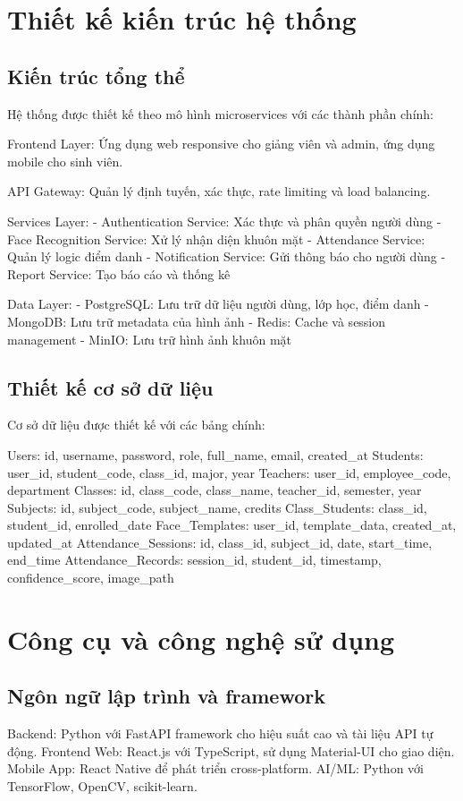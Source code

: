 \documentclass[12pt,a4paper]{report}
\begin{document}
\section{Thiết kế kiến trúc hệ thống}
\subsection{Kiến trúc tổng thể}
Hệ thống được thiết kế theo mô hình microservices với các thành phần chính:

Frontend Layer: Ứng dụng web responsive cho giảng viên và admin, ứng dụng mobile cho sinh viên.

API Gateway: Quản lý định tuyến, xác thực, rate limiting và load balancing.

Services Layer: 
- Authentication Service: Xác thực và phân quyền người dùng
- Face Recognition Service: Xử lý nhận diện khuôn mặt
- Attendance Service: Quản lý logic điểm danh
- Notification Service: Gửi thông báo cho người dùng
- Report Service: Tạo báo cáo và thống kê

Data Layer: 
- PostgreSQL: Lưu trữ dữ liệu người dùng, lớp học, điểm danh
- MongoDB: Lưu trữ metadata của hình ảnh
- Redis: Cache và session management
- MinIO: Lưu trữ hình ảnh khuôn mặt

\subsection{Thiết kế cơ sở dữ liệu}
Cơ sở dữ liệu được thiết kế với các bảng chính:

Users: id, username, password, role, full_name, email, created_at
Students: user_id, student_code, class_id, major, year
Teachers: user_id, employee_code, department
Classes: id, class_code, class_name, teacher_id, semester, year
Subjects: id, subject_code, subject_name, credits
Class_Students: class_id, student_id, enrolled_date
Face_Templates: user_id, template_data, created_at, updated_at
Attendance_Sessions: id, class_id, subject_id, date, start_time, end_time
Attendance_Records: session_id, student_id, timestamp, confidence_score, image_path

\section{Công cụ và công nghệ sử dụng}
\subsection{Ngôn ngữ lập trình và framework}
Backend: Python với FastAPI framework cho hiệu suất cao và tài liệu API tự động.
Frontend Web: React.js với TypeScript, sử dụng Material-UI cho giao diện.
Mobile App: React Native để phát triển cross-platform.
AI/ML: Python với TensorFlow, OpenCV, scikit-learn.
\end{document}
